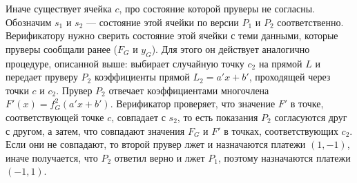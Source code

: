 \documentclass[14pt, a4paper]{extreport}
\begin{document}
        Иначе существует ячейка $c$, про состояние которой пруверы не согласны. Обозначим $s_1$ и $s_2$ --- состояние этой ячейки по версии $P_1$ и $P_2$ соответственно. Верификатору нужно сверить состояние этой ячейки с теми данными, которые пруверы сообщали ранее ($F_G$ и $y_G$). Для этого он действует аналогично процедуре, описанной выше: выбирает случайную точку $c_2$ на прямой $L$ и передает пруверу $P_2$ коэффициенты прямой $L_2 = a'x + b'$, проходящей через точки $c$ и $c_2$. Прувер $P_2$ отвечает коэффициентами многочлена $F'(x) = f^2_G(a'x + b')$. Верификатор проверяет, что значение $F'$ в точке, соответствующей точке $c$, совпадает с $s_2$, то есть показания $P_2$ согласуются друг с другом, а затем, что совпадают значения $F_G$ и $F'$ в точках, соответствующих $c_2$. Если они не совпадают, то второй прувер лжет и назначаются платежи $(1, -1)$, иначе получается, что $P_2$ ответил верно и лжет $P_1$, поэтому назначаются платежи $(-1, 1)$.
\end{document}
